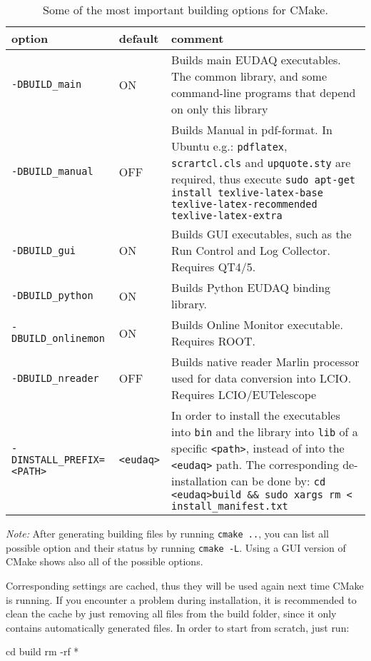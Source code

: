 \begin{table}[!h]
{\footnotesize
\begin{tabular}{l|l|p{9.5cm}}
option &  default &  comment \\
\hline
\texttt{-DBUILD\_main} &  ON & Builds main EUDAQ executables.
The common library, and some command-line programs that depend on only this library \\
\texttt{-DBUILD\_manual} & OFF &  Builds Manual in pdf-format. In Ubuntu e.g.: \texttt{pdflatex}, \texttt{scrartcl.cls} and \texttt{upquote.sty} are required, thus execute \texttt{sudo apt-get install texlive-latex-base texlive-latex-recommended texlive-latex-extra} \\
\texttt{-DBUILD\_gui} &  ON & Builds GUI executables, such as the Run Control and Log Collector. Requires QT4/5. \\
\texttt{-DBUILD\_python} & ON & Builds Python EUDAQ binding library. \\
\texttt{-DBUILD\_onlinemon} &  ON & Builds Online Monitor executable. Requires ROOT. \\
\texttt{-DBUILD\_nreader} &  OFF &  Builds native reader Marlin processor used for data conversion into LCIO. Requires LCIO/EUTelescope \\
\texttt{-DINSTALL\_PREFIX=<PATH>} & \texttt{<eudaq>} & In order to install the executables into \texttt{bin} and the library into \texttt{lib} of a specific \texttt{<path>}, instead of into the \texttt{<eudaq>} path. 
The corresponding de-installation can be done by:
\texttt{cd <eudaq>\/build\/ \&\& sudo xargs rm < install\_manifest.txt}
\end{tabular}
\caption{Some of the most important building options for CMake.}
\label{tab:cmakeoptions}
}
\end{table}

\textit{Note:} After generating building files by running \texttt{cmake ..}, you can list all possible option and their status by running \texttt{cmake -L}. 
Using a GUI version of CMake shows also all of the possible options.   

Corresponding settings are cached, thus they will be used again next time CMake is running.
If you encounter a problem during installation, it is recommended to clean the cache by just removing all files from the build folder, since it only contains automatically generated files. 
In order to start from scratch, just run:
\begin{listing}[mybash]
cd build
rm -rf *
\end{listing}



